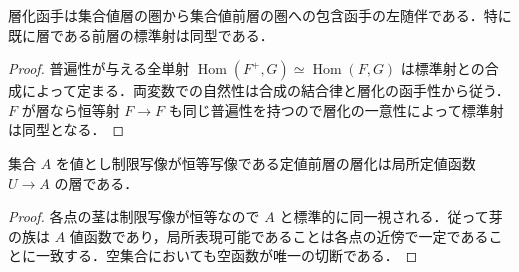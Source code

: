 \begin{prop}[層化と包含函手の随伴]
層化函手は集合値層の圏から集合値前層の圏への包含函手の左随伴である．特に既に層である前層の標準射は同型である．
\end{prop}
\begin{proof}
普遍性が与える全単射 $\operatorname{Hom}(F^+,G)\simeq\operatorname{Hom}(F,G)$ は標準射との合成によって定まる．両変数での自然性は合成の結合律と層化の函手性から従う．$F$ が層なら恒等射 $F\to F$ も同じ普遍性を持つので層化の一意性によって標準射は同型となる．
\end{proof}
\begin{prop}[定値前層の層化]
集合 $A$ を値とし制限写像が恒等写像である定値前層の層化は局所定値函数 $U\to A$ の層である．
\end{prop}
\begin{proof}
各点の茎は制限写像が恒等なので $A$ と標準的に同一視される．従って芽の族は $A$ 値函数であり，局所表現可能であることは各点の近傍で一定であることに一致する．空集合においても空函数が唯一の切断である．
\end{proof}
